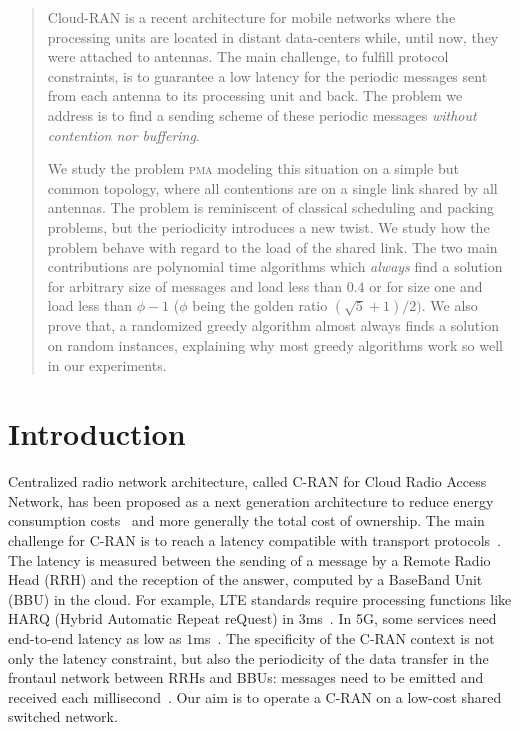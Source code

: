 \documentclass[a4paper,cleveref, autoref, thm-restate,UKenglish]{lipics-v2019}
\newcommand\pma{\textsc{pma}\xspace}
\begin{document}
\begin{abstract}
Cloud-RAN is a recent architecture for mobile networks where the processing units are located in distant data-centers while, until now, they were attached to antennas. The main challenge, to fulfill protocol constraints, is to guarantee a low latency for the periodic messages sent from each antenna to its processing unit and back. The problem we address is to find a sending scheme of these periodic messages \emph{without contention nor buffering}.

We study the problem \pma modeling this situation on a simple but common topology, where all contentions are on a single link shared by all antennas. The problem is reminiscent of classical scheduling and packing problems, but the periodicity introduces a new twist. We study how the problem behave with regard to the load of the shared link.
The two main contributions are polynomial time algorithms which \emph{always} find a solution for arbitrary size of messages and load less than $0.4$ or for size one and load less than $\phi - 1$ ($\phi$ being the golden ratio $(\sqrt{5}+1)/2)$. We also prove that, a randomized greedy algorithm almost always finds a solution on random instances, explaining why most greedy algorithms work so well in our experiments.
\end{abstract}

\section{Introduction}
Centralized radio network architecture, called C-RAN for Cloud Radio Access Network, has been proposed as a next generation architecture to reduce energy consumption costs~\cite{mobile2011c} and more generally the total cost of ownership. The main challenge for C-RAN is to reach a latency compatible with transport protocols~\cite{ieeep802}. The latency is measured between the sending of a message by a Remote Radio Head (RRH) and the reception of the answer, computed by a BaseBand Unit (BBU) in the cloud. For example, LTE standards require processing functions like HARQ (Hybrid Automatic Repeat reQuest) in $3$ms~\cite{bouguen2012lte}. In 5G, some services need end-to-end latency as low as $1$ms~\cite{3gpp5g,boccardi2014five}. The specificity of the C-RAN context is not only the latency constraint, but also the periodicity of the data transfer in the frontaul network between RRHs and BBUs: messages need to be emitted and received each millisecond~\cite{bouguen2012lte}. Our aim is to operate a C-RAN on a low-cost shared switched network.
\end{document}
